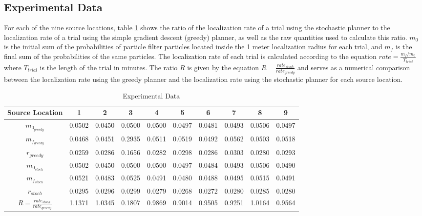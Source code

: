 \documentclass[submit, 12pt]{aiaa-pretty-modified}
\begin{document}
\subsection{Experimental Data}
For each of the nine source locations, table \ref{tab:data} shows the
ratio of the localization rate of
a trial using the stochastic planner to the localization rate of
a trial using the simple gradient descent (greedy) planner, as well as
the raw quantities used to calculate this ratio. $m_0$ is the initial sum of
the probabilities of particle filter particles located inside the 1
meter localization radius for each trial, and $m_f$ is the final sum
of the probabilities of the same particles. The localization rate of
each trial is calculated according to the equation $rate =
\frac{m_f/m_0}{T_{trial}}$ where $T_{trial}$ is the length of the
trial in minutes.  The ratio $R$ is given by the equation $R =
\frac{rate_{stoch}}{rate_{greedy}}$ and serves as a numerical
comparison between the localization rate using the greedy planner and
the localization rate using the stochastic planner for each source location.

\begin{table}[htb]
\begin{center}
\begin{tabular}{|c||c||c||c||c||c||c||c||c||c|}
\hline
 Source Location & 1 & 2 & 3 & 4 & 5 & 6 & 7 & 8 & 9 \\
\hline \hline
$m_{0_{greedy}}$ & 0.0502 & 0.0450 & 0.0500 & 0.0500 & 0.0497 & 0.0481 & 0.0493 & 0.0506 & 0.0497 \\
\hline
$m_{f_{greedy}}$ & 0.0468 & 0.0451 & 0.2935 & 0.0511 & 0.0519 & 0.0492 & 0.0562 & 0.0503 & 0.0518 \\
\hline
$r_{greedy}$ & 0.0259 & 0.0286 & 0.1656 & 0.0282 & 0.0298 & 0.0286 & 0.0303 & 0.0280 & 0.0293 \\
\hline
$m_{0_{stoch}}$ & 0.0502 & 0.0450 & 0.0500 & 0.0500 & 0.0497 & 0.0484 & 0.0493 & 0.0506 & 0.0490 \\
\hline
$m_{f_{stoch}}$ & 0.0521 & 0.0483 & 0.0525 & 0.0491 & 0.0480 & 0.0488 & 0.0495 & 0.0515 & 0.0491 \\
\hline
$r_{stoch}$ & 0.0295 & 0.0296 & 0.0299 & 0.0279 & 0.0268 & 0.0272 & 0.0280 & 0.0285 & 0.0280 \\
\hline
\hline
$R = \frac{rate_{stoch}}{rate_{greedy}}$  & 1.1371 & 1.0345 & 0.1807 & 0.9869 &
0.9014 & 0.9505  & 0.9251 & 1.0164 & 0.9564\\
\hline
\end{tabular}
\caption{Experimental Data \label{tab:data} }
\end{center}
\end{table}
\end{document}
